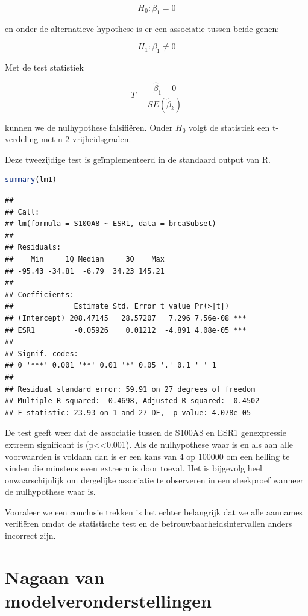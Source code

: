 \documentclass[
  12pt,dutch,coursenotes]{book}
\begin{document}
\[H_0: \beta_1=0\]

en onder de alternatieve hypothese is er een associatie tussen beide genen:

\[H_1: \beta_1\neq0\]

Met de test statistiek

\[T=\frac{\hat{\beta}_1-0}{SE(\hat{\beta}_k)}\]

kunnen we de nulhypothese falsifiëren. Onder \(H_0\) volgt de statistiek een t-verdeling met n-2 vrijheidsgraden.

Deze tweezijdige test is geïmplementeerd in de standaard output van R.

\begin{lstlisting}[language=R]
summary(lm1)
\end{lstlisting}

\begin{lstlisting}
## 
## Call:
## lm(formula = S100A8 ~ ESR1, data = brcaSubset)
## 
## Residuals:
##    Min     1Q Median     3Q    Max 
## -95.43 -34.81  -6.79  34.23 145.21 
## 
## Coefficients:
##              Estimate Std. Error t value Pr(>|t|)    
## (Intercept) 208.47145   28.57207   7.296 7.56e-08 ***
## ESR1         -0.05926    0.01212  -4.891 4.08e-05 ***
## ---
## Signif. codes:  
## 0 '***' 0.001 '**' 0.01 '*' 0.05 '.' 0.1 ' ' 1
## 
## Residual standard error: 59.91 on 27 degrees of freedom
## Multiple R-squared:  0.4698, Adjusted R-squared:  0.4502 
## F-statistic: 23.93 on 1 and 27 DF,  p-value: 4.078e-05
\end{lstlisting}

De test geeft weer dat de associatie tussen de S100A8 en ESR1 genexpressie extreem significant is (p\textless\textless0.001). Als de nulhypothese waar is en als aan alle voorwaarden is voldaan dan is er een kans van 4 op 100000 om een helling te vinden die minstens even extreem is door toeval. Het is bijgevolg heel onwaarschijnlijk om dergelijke associatie te observeren in een steekproef wanneer de nulhypothese waar is.

Vooraleer we een conclusie trekken is het echter belangrijk dat we alle aannames verifiëren omdat de statistische test en de betrouwbaarheidsintervallen anders incorrect zijn.

\hypertarget{nagaan-van-modelveronderstellingen}{%
\section{Nagaan van modelveronderstellingen}\label{nagaan-van-modelveronderstellingen}}
\end{document}
